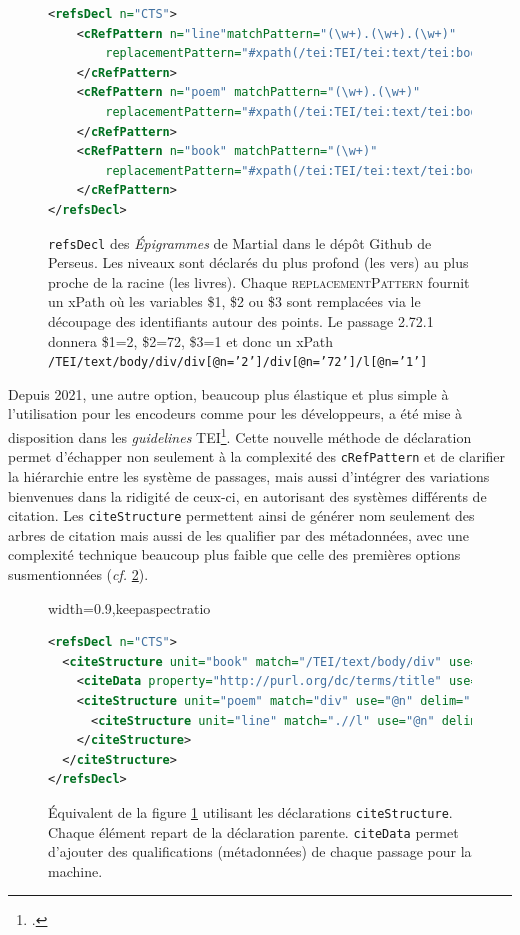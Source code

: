 \begin{figure}[ht]
    \centering
    \lstset{language=XML}
    \begin{lstlisting}[language=XML]
<refsDecl n="CTS">
    <cRefPattern n="line"matchPattern="(\w+).(\w+).(\w+)"
        replacementPattern="#xpath(/tei:TEI/tei:text/tei:body/tei:div/tei:div[@n='$1']/tei:div[@n='$2']/tei:l[@n='$3'])">
    </cRefPattern>
    <cRefPattern n="poem" matchPattern="(\w+).(\w+)"
        replacementPattern="#xpath(/tei:TEI/tei:text/tei:body/tei:div/tei:div[@n='$1']/tei:div[@n='$2'])">
    </cRefPattern>
    <cRefPattern n="book" matchPattern="(\w+)"
        replacementPattern="#xpath(/tei:TEI/tei:text/tei:body/tei:div/tei:div[@n='$1'])">
    </cRefPattern>
</refsDecl>
    \end{lstlisting}
    \caption{\texttt{refsDecl} des \textit{Épigrammes} de Martial dans le dépôt Github de Perseus. Les niveaux sont déclarés du plus profond (les vers) au plus proche de la racine (les livres). Chaque \textsc{replacementPattern} fournit un xPath où les variables \$1, \$2 ou \$3 sont remplacées via le découpage des identifiants autour des points. Le passage 2.72.1 donnera \$1=2, \$2=72, \$3=1 et donc un xPath \texttt{/TEI/text/body/div/div[@n='2']/div[@n='72']/l[@n='1']}}
    \label{chap1:xml:cRefPattern}
\end{figure}

Depuis 2021, une autre option, beaucoup plus élastique et plus simple à l'utilisation pour les encodeurs comme pour les développeurs, a été mise à disposition dans les \textit{guidelines} TEI\footcite{cayless_introducing_2021}. Cette nouvelle méthode de déclaration permet d'échapper non seulement à la complexité des \texttt{cRefPattern} et de clarifier la hiérarchie entre les système de passages, mais aussi d'intégrer des variations bienvenues dans la ridigité de ceux-ci, en autorisant des systèmes différents de citation. Les \texttt{citeStructure} permettent ainsi de générer nom seulement des arbres de citation mais aussi de les qualifier par des métadonnées, avec une complexité technique beaucoup plus faible que celle des premières options susmentionnées (\textit{cf.} \ref{chap1:xml:citeStructure}).

\begin{figure}[ht]
    \centering
    \begin{adjustbox}{width=0.9\textwidth,keepaspectratio}
    \lstset{language=XML}
    \begin{lstlisting}[language=XML]
<refsDecl n="CTS">
  <citeStructure unit="book" match="/TEI/text/body/div" use="@n">
    <citeData property="http://purl.org/dc/terms/title" use="head"/>
    <citeStructure unit="poem" match="div" use="@n" delim=".">
      <citeStructure unit="line" match=".//l" use="@n" delim="."/>
    </citeStructure>
  </citeStructure>
</refsDecl>
    \end{lstlisting}
    \end{adjustbox}
    \caption{Équivalent de la figure \ref{chap1:xml:cRefPattern} utilisant les déclarations \texttt{citeStructure}. Chaque élément repart de la déclaration parente. \texttt{citeData} permet d'ajouter des qualifications (métadonnées) de chaque passage pour la machine.}
    \label{chap1:xml:citeStructure}
\end{figure}


